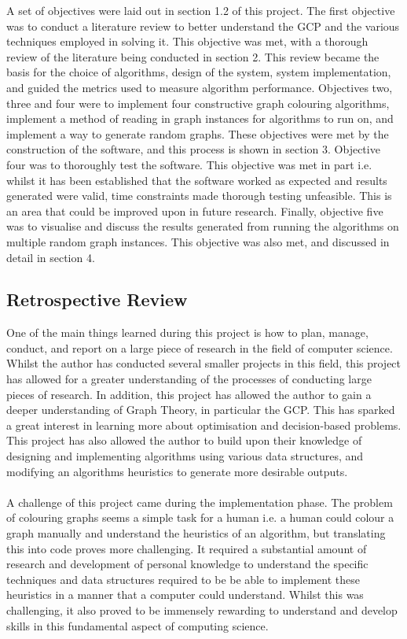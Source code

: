 A set of objectives were laid out in section 1.2 of this project. The first objective was to conduct a literature review to better understand the GCP and the various techniques employed in solving it. This objective was met, with a thorough review of the literature being conducted in section 2. This review became the basis for the choice of algorithms, design of the system, system implementation, and guided the metrics used to measure algorithm performance. Objectives two, three and four were to implement four constructive graph colouring algorithms, implement a method of reading in graph instances for algorithms to run on, and implement a way to generate random graphs. These objectives were met by the construction of the software, and this process is shown in section 3. Objective four was to thoroughly test the software. This objective was met in part i.e. whilst it has been established that the software worked as expected and results generated were valid, time constraints made thorough testing unfeasible. This is an area that could be improved upon in future research. Finally, objective five was to visualise and discuss the results generated from running the algorithms on multiple random graph instances. This objective was also met, and discussed in detail in section 4. 

\subsection{Retrospective Review}
One of the main things learned during this project is how to plan, manage, conduct, and report on a large piece of research in the field of computer science. Whilst the author has conducted several smaller projects in this field, this project has allowed for a greater understanding of the processes of conducting large pieces of research. In addition, this project has allowed the author to gain a deeper understanding of Graph Theory, in particular the GCP. This has sparked a great interest in learning more about optimisation and decision-based problems. This project has also allowed the author to build upon their knowledge of designing and implementing algorithms using various data structures, and modifying an algorithms heuristics to generate more desirable outputs. 
\\\\
A challenge of this project came during the implementation phase. The problem of colouring graphs seems a simple task for a human i.e. a human could colour a graph manually and understand the heuristics of an algorithm, but translating this into code proves more challenging. It required a substantial amount of research and development of personal knowledge to understand the specific techniques and data structures required to be be able to implement these heuristics in a manner that a computer could understand. Whilst this was challenging, it also proved to be immensely rewarding to understand and develop skills in this fundamental aspect of computing science.


